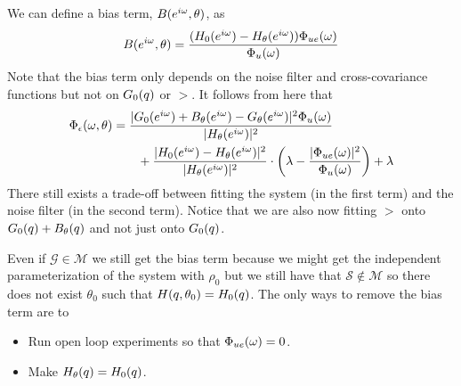 We can define a bias term, $B(e^{i\omega},\theta)$, as
$$B(e^{i\omega},\theta) = \frac{(H_0(e^{i\omega})-H_\theta(e^{i\omega}))\Phi_{ue}(\omega)}{\Phi_u(\omega)}$$
Note that the bias term only depends on the noise filter and cross-covariance functions but not on $G_0(q)$ or $\gt$.
It follows from here that
\begin{align*}
\Phi_\epsilon(\omega,\theta) &= \frac{|G_0(e^{i\omega})+B_\theta(e^{i\omega})-G_\theta(e^{i\omega})|^2\Phi_u(\omega)}{|H_\theta(e^{i\omega})|^2} \\
&\qquad + \frac{|H_0(e^{i\omega})-H_\theta(e^{i\omega})|^2}{|H_\theta(e^{i\omega})|^2}\cdot \left(\lambda-\frac{|\Phi_{ue}(\omega)|^2}{\Phi_u(\omega)}\right) + \lambda
\end{align*}
There still exists a trade-off between fitting the system (in the first term) and the noise filter (in the second term).
Notice that we are also now fitting $\gt$ onto $G_0(q)+B_\theta(q)$ and not just onto $G_0(q)$.

Even if $\mathcal{G}\in\mathcal{M}$ we still get the bias term because we might get the independent parameterization of the system with $\rho_0$ but we still have that $\mathcal{S}\notin\mathcal{M}$ so there does not exist $\theta_0$ such that $H(q,\theta_0)=H_0(q)$.
The only ways to remove the bias term are to
\begin{itemize}
\item Run open loop experiments so that $\Phi_{ue}(\omega)=0$.
\item Make $H_\theta(q)=H_0(q)$.
\end{itemize}
